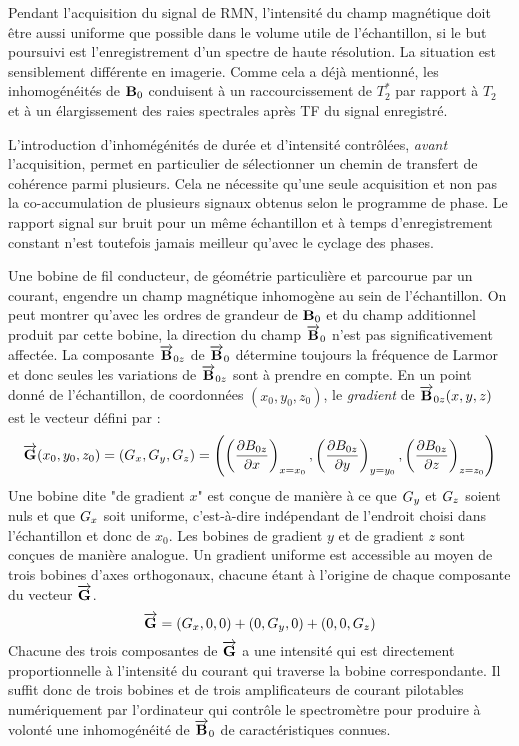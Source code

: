 Pendant l'acquisition du signal de RMN, l'intensité du champ magnétique doit être
aussi uniforme que possible dans le volume utile de l'échantillon, si le but
poursuivi est l'enregistrement d'un spectre de haute résolution.
La situation est sensiblement différente en imagerie.
Comme cela a déjà mentionné, les inhomogénéités de $\mathbf{B}_0$ conduisent à
un raccourcissement de $T_2^*$ par rapport à $T_2$ et à un élargissement
des raies spectrales après TF du signal enregistré.

L'introduction d'inhomégénités de durée et d'intensité contrôlées,
\emph{avant} l'acquisition, permet en particulier
de sélectionner un chemin de transfert de cohérence parmi plusieurs.
Cela ne nécessite qu'une seule acquisition et non pas la co-accumulation
de plusieurs signaux obtenus selon le programme de phase.
Le rapport signal sur bruit pour un même échantillon et à temps d'enregistrement
constant n'est toutefois jamais meilleur qu'avec le cyclage des phases.

Une bobine de fil conducteur, de géométrie particulière et parcourue par un courant, 
engendre un champ magnétique inhomogène au sein de l'échantillon.
On peut montrer qu'avec les ordres de grandeur de $\mathbf{B}_0$ et du champ additionnel
produit par cette bobine, la direction du champ $\overrightarrow{\mathbf{B}}_0$ n'est pas 
significativement affectée.
La composante $\overrightarrow{\mathbf{B}}_{0z}$ de $\overrightarrow{\mathbf{B}}_0$ détermine toujours la fréquence de Larmor
et donc seules les variations de $\overrightarrow{\mathbf{B}}_{0z}$ sont à prendre en compte.
En un point donné de l'échantillon, de coordonnées $(x_0, y_0, z_0)$,
le \emph{gradient} de $\overrightarrow{\mathbf{B}}_{0z}(x,y,z)$ est le vecteur défini par :
\begin{equation}
\label{eqn:graddef}
\overrightarrow{\mathbf{G}}(x_0,y_0,z_0) = (G_x, G_y, G_z) = \left(
\left( \frac{\partial B_{0z}}{\partial x} \right)_{x=x_0}, 
\left( \frac{\partial B_{0z}}{\partial y} \right)_{y=y_0}, 
\left( \frac{\partial B_{0z}}{\partial z} \right)_{z=z_0}
\right)
\end{equation}
Une bobine dite "de gradient $x$" est conçue de manière à ce que $G_y$ et $G_z$ soient nuls
et que $G_x$ soit uniforme, c'est-à-dire indépendant de l'endroit choisi 
dans l'échantillon et donc de $x_0$.
Les bobines de gradient $y$ et de gradient $z$ sont conçues de manière analogue.
Un gradient uniforme est accessible au moyen de trois bobines d'axes orthogonaux,
chacune étant à l'origine de chaque composante du vecteur $\overrightarrow{\mathbf{G}}$.
\begin{equation}
\overrightarrow{\mathbf{G}} = (G_x, 0, 0) + (0, G_y, 0) + (0, 0, G_z)
\end{equation}
Chacune des trois composantes de $\overrightarrow{\mathbf{G}}$ a une intensité qui est directement
proportionnelle à l'intensité du courant qui traverse la bobine correspondante.
Il suffit donc de trois bobines et de trois amplificateurs de courant pilotables
numériquement par l'ordinateur qui contrôle le spectromètre 
pour produire à volonté une inhomogénéité de $\overrightarrow{\mathbf{B}}_0$ de caractéristiques connues.

